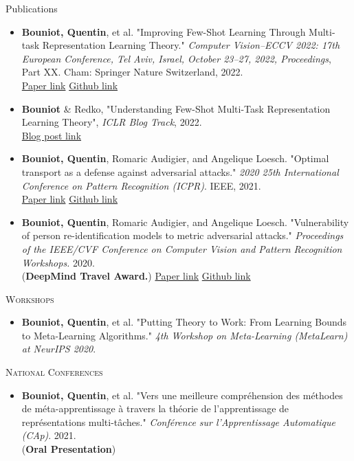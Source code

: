 \documentclass{resume} %
\begin{document}
\begin{rSection}{Publications}
\begin{itemize}[label=$\cdot$]
        \item \textbf{Bouniot, Quentin}, et al. "Improving Few-Shot Learning Through Multi-task Representation Learning Theory." \emph{Computer Vision–ECCV 2022: 17th European Conference, Tel Aviv, Israel, October 23–27, 2022, Proceedings}, Part XX. Cham: Springer Nature Switzerland, 2022. \\ \href{https://arxiv.org/abs/2010.01992}{Paper link} \href{https://github.com/CEA-LIST/MetaMTReg}{Github link}

        \item \textbf{Bouniot} \& Redko, "Understanding Few-Shot Multi-Task Representation Learning Theory", \emph{ICLR Blog Track}, 2022. \\ \href{https://iclr-blog-track.github.io/2022/03/25/understanding_mtr_meta/}{Blog post link}

        \item \textbf{Bouniot, Quentin}, Romaric Audigier, and Angelique Loesch. "Optimal transport as a defense against adversarial attacks." \emph{2020 25th International Conference on Pattern Recognition (ICPR)}. IEEE, 2021. \\ \href{https://arxiv.org/abs/2102.03156}{Paper link} \href{https://github.com/CEA-LIST/adv-sat}{Github link}

        \item \textbf{Bouniot, Quentin}, Romaric Audigier, and Angelique Loesch. "Vulnerability of person re-identification models to metric adversarial attacks." \emph{Proceedings of the IEEE/CVF Conference on Computer Vision and Pattern Recognition Workshops.} 2020. \\ (\textbf{DeepMind Travel Award.}) \href{https://openaccess.thecvf.com/content_CVPRW_2020/html/w47/Bouniot_Vulnerability_of_Person_Re-Identification_Models_to_Metric_Adversarial_Attacks_CVPRW_2020_paper.html}{Paper link} \href{https://github.com/CEA-LIST/adv-reid}{Github link}
    \end{itemize}

    \textsc{Workshops}

    \begin{itemize}[label=$\cdot$]
        \item \textbf{Bouniot, Quentin}, et al. "Putting Theory to Work: From Learning Bounds to Meta-Learning Algorithms." \emph{4th Workshop on Meta-Learning (MetaLearn) at NeurIPS 2020}.
    \end{itemize}

    \textsc{National Conferences}
    \begin{itemize}[label=$\cdot$]
        \item \textbf{Bouniot, Quentin}, et al. "Vers une meilleure compréhension des méthodes de méta-apprentissage à travers la théorie de l'apprentissage de représentations multi-tâches." \emph{Conférence sur l'Apprentissage Automatique (CAp)}. 2021. \\ (\textbf{Oral Presentation})
    \end{itemize}

\end{rSection}
\end{document}
